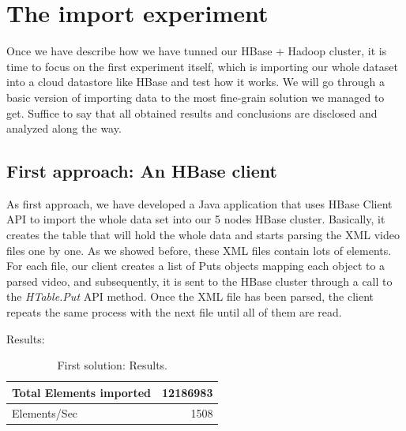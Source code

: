 \section{The import experiment}

Once we have describe how we have tunned our HBase + Hadoop cluster, it is time to focus on the first experiment itself, which is importing our whole dataset into a cloud datastore like HBase and test how it works. We will go through a basic version of importing data to the most fine-grain solution we managed to get. Suffice to say that all obtained results and conclusions are disclosed and analyzed along the way.

\subsection{First approach: An HBase client}

As first approach, we have developed a Java application that uses HBase Client API to import the whole data set into our 5 nodes HBase cluster. Basically, it creates the table that will hold the whole data and starts parsing the XML video files one by one. As we showed before, these XML files contain lots of elements. For each file, our client creates a list of Puts objects mapping each object to a parsed video, and subsequently, it is sent to the HBase cluster through a call to the \textit{HTable.Put} API method. Once the XML file has been parsed, the client repeats the same process with the next file until all of them are read.

\bigskip

Results:

\bigskip



\begin{table}[htbp]
\begin{center}
\begin{tabular}{|l|r|}
\hline
Total Elements imported & 12186983 \\ \hline
Elements/Sec & 1508 \\ \hline
\end{tabular}
\caption{First solution: Results.}
\label{First solution: Results}
\end{center}
\end{table}




